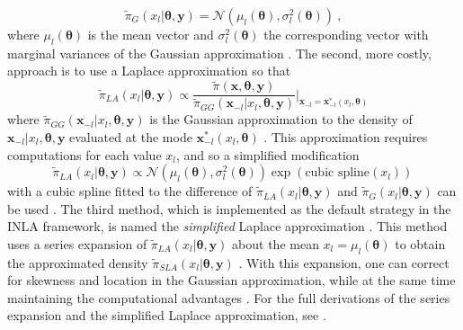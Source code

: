 \begin{equation}
    \tilde{\pi}_G(x_l\lvert\boldsymbol{\theta}, \mathbf{y}) = \mathcal{N}(\mu_l(\boldsymbol{\theta}), \sigma_l^2(\boldsymbol{\theta})) \ ,
\end{equation} 
where $\mu_l(\boldsymbol{\theta})$ is the mean vector and $\sigma_l^2(\boldsymbol{\theta})$ the corresponding vector with marginal variances of the Gaussian approximation \citep{rue2009inla}. The second, more costly, approach is to use a Laplace approximation so that 
\begin{equation}
    \tilde{\pi}_{LA}(x_l\lvert\boldsymbol{\theta}, \mathbf{y}) \propto \frac{\tilde{\pi}(\mathbf{x}, \boldsymbol{\theta}, \mathbf{y})}{\tilde{\pi}_{GG}(\mathbf{x}_{-l}\lvert x_l, \boldsymbol{\theta}, \mathbf{y})} \bigg\lvert_{\mathbf{x}_{-l}=\mathbf{x}_{-l}^*(x_l, \boldsymbol{\theta})}
\end{equation} 
where $\tilde{\pi}_{GG}(\mathbf{x}_{-l}\lvert x_l, \boldsymbol{\theta}, \mathbf{y})$ is the Gaussian approximation to the density of $\mathbf{x}_{-l}\lvert x_l, \boldsymbol{\theta}, \mathbf{y}$ evaluated at the mode $\mathbf{x}_{-l}^*(x_l, \boldsymbol{\theta})$ \citep{gomezrubio2020inla}. This approximation requires computations for each value $x_l$, and so a simplified modification 
\begin{equation}
    \tilde{\pi}_{LA}(x_l\lvert\boldsymbol{\theta}, \mathbf{y}) \propto \mathcal{N}(\mu_l(\boldsymbol{\theta}), \sigma_l^2(\boldsymbol{\theta}))\exp(\text{cubic spline}(x_l)) \, 
\end{equation}
with a cubic spline fitted to the difference of $\tilde{\pi}_{LA}(x_l\lvert\boldsymbol{\theta}, \mathbf{y})$ and $\tilde{\pi}_G(x_l\lvert\boldsymbol{\theta}, \mathbf{y})$ can be used \citep{rue2009inla}. The third method, which is implemented as the default strategy in the INLA framework, is named the \textit{simplified} Laplace approximation \citep{rue2009inla}. This method uses a series expansion of $\tilde{\pi}_{LA}(x_l\lvert\boldsymbol{\theta}, \mathbf{y})$ about the mean $x_l = \mu_l(\boldsymbol{\theta})$ to obtain the approximated density $\tilde{\pi}_{SLA}(x_l\lvert\boldsymbol{\theta}, \mathbf{y})$ \citep{gomezrubio2020inla}. With this expansion, one can correct for skewness and location in the Gaussian approximation, while at the same time maintaining the computational advantages \citep{gomezrubio2020inla}. For the full derivations of the series expansion and the simplified Laplace approximation, see \citet[chapter 3.2.3]{rue2009inla}.
